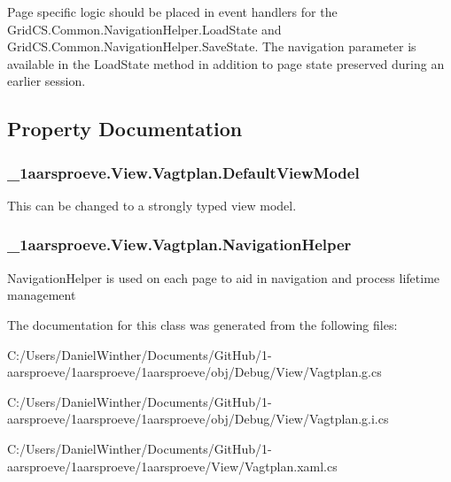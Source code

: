 Page specific logic should be placed in event handlers for the Grid\+C\+S.\+Common.\+Navigation\+Helper.\+Load\+State and Grid\+C\+S.\+Common.\+Navigation\+Helper.\+Save\+State. The navigation parameter is available in the Load\+State method in addition to page state preserved during an earlier session. 

\subsection{Property Documentation}
\hypertarget{class__1aarsproeve_1_1_view_1_1_vagtplan_aa886f262e9d0680645f45daa22bd473a}{}
\subsubsection[{Default\+View\+Model}]{ \+\_\+1aarsproeve.\+View.\+Vagtplan.\+Default\+View\+Model\hspace{0.3cm}{\ttfamily [get]}}\label{class__1aarsproeve_1_1_view_1_1_vagtplan_aa886f262e9d0680645f45daa22bd473a}


This can be changed to a strongly typed view model. 

\hypertarget{class__1aarsproeve_1_1_view_1_1_vagtplan_a8821ea381132cfc4259a782a59201134}{}
\subsubsection[{Navigation\+Helper}]{ \+\_\+1aarsproeve.\+View.\+Vagtplan.\+Navigation\+Helper\hspace{0.3cm}{\ttfamily [get]}}\label{class__1aarsproeve_1_1_view_1_1_vagtplan_a8821ea381132cfc4259a782a59201134}


Navigation\+Helper is used on each page to aid in navigation and process lifetime management 



The documentation for this class was generated from the following files\+:\begin{DoxyCompactItemize}
\item 
C\+:/\+Users/\+Daniel\+Winther/\+Documents/\+Git\+Hub/1-\/aarsproeve/1aarsproeve/1aarsproeve/obj/\+Debug/\+View/Vagtplan.\+g.\+cs\item 
C\+:/\+Users/\+Daniel\+Winther/\+Documents/\+Git\+Hub/1-\/aarsproeve/1aarsproeve/1aarsproeve/obj/\+Debug/\+View/Vagtplan.\+g.\+i.\+cs\item 
C\+:/\+Users/\+Daniel\+Winther/\+Documents/\+Git\+Hub/1-\/aarsproeve/1aarsproeve/1aarsproeve/\+View/Vagtplan.\+xaml.\+cs\end{DoxyCompactItemize}
